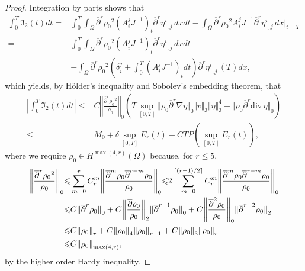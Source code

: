 \documentclass[12pt,twoside,reqno]{amsart}
\numberwithin{equation}{section}
\theoremstyle{definition}
\theoremstyle{remark}
\begin{document}
\begin{proof}
Integration by parts shows that
\begin{align*}
  \int_0^T {\mathfrak{I}}_2(t)dt=&{\int_0^T\!\!\!\!\int_\Omega }  {\overline{\partial}}^r{\rho_0}^2   (A^j_i J^{-1})_t{{{{\overline{\partial}}^r \eta^i}}_{,{j}}\,}dx dt-\int_\Omega {\overline{\partial}}^r{\rho_0}^2   A^j_i J^{-1}{{{{\overline{\partial}}^r \eta^i}}_{,{j}}\,}dx\Big|_{t=T}\\
  =&{\int_0^T\!\!\!\!\int_\Omega }  {\overline{\partial}}^r{\rho_0}^2   (A^j_i J^{-1})_t{{{{\overline{\partial}}^r \eta^i}}_{,{j}}\,}dx dt\\
  &-\int_\Omega {\overline{\partial}}^r{\rho_0}^2 \left( \delta_i^j+\int_0^T (A^j_i J^{-1})_tdt\right){{{{\overline{\partial}}^r \eta^i}}_{,{j}}\,}(T) dx,
\end{align*}
which yields, by H\"older's inequality and Sobolev's embedding theorem, that
\begin{align*}
  {\left\vert{\int_0^T {\mathfrak{I}}_2(t)dt}\right\vert}{\leqslant} &C{\left\Vert{\frac{{\overline{\partial}}^r{\rho_0}^2 }{\rho_0}}\right\Vert}_{0}\left(T\sup_{[0,T]} {\Vert{{\rho_0} {\overline{\partial}}^r{\nabla}\eta}\Vert}_0 {\Vert{v}\Vert}_3{\Vert{\eta}\Vert}_3^4+{\Vert{{\rho_0} {\overline{\partial}}^r{\mathrm{div}\,}\eta}\Vert}_0\right)\\
  {\leqslant} &M_0+\delta\sup_{[0,T]}E_r(t)+CTP(\sup_{[0,T]}E_r(t)),
\end{align*}
where we require ${\rho_0} \in H^{\max(4,r)}(\Omega)$ because, for $r{\leqslant} 5$,
\begin{align}
  {\left\Vert{\frac{{\overline{\partial}}^r{\rho_0}^2 }{\rho_0}}\right\Vert}_{0}{\leqslant}&\sum_{m=0}^rC_r^m{\left\Vert{\frac{{\overline{\partial}}^m {\rho_0}{\overline{\partial}}^{r-m}{\rho_0}}{\rho_0}}\right\Vert}_0{\leqslant} 2\sum_{m=0}^{{\left\lceil{(r-1)/2}\right\rceil}} C_r^m{\left\Vert{\frac{{\overline{\partial}}^m {\rho_0}{\overline{\partial}}^{r-m}{\rho_0}}{\rho_0}}\right\Vert}_0{\nonumber}\\
  {\leqslant}&C{\Vert{{\overline{\partial}}^r{\rho_0}}\Vert}_0+C{\left\Vert{\frac{{\overline{\partial}}{\rho_0}}{\rho_0}}\right\Vert}_2{\Vert{{\overline{\partial}}^{r-1}{\rho_0}}\Vert}_0 +C{\left\Vert{\frac{{\overline{\partial}}^2{\rho_0}}{\rho_0}}\right\Vert}_0{\Vert{{\overline{\partial}}^{r-2}{\rho_0}}\Vert}_2{\nonumber}\\
  {\leqslant}&C{\Vert{\rho_0}\Vert}_r+C{\Vert{\rho_0}\Vert}_4{\Vert{\rho_0}\Vert}_{r-1}+C{\Vert{\rho_0}\Vert}_3{\Vert{\rho_0}\Vert}_r{\nonumber}\\
  {\leqslant} &C{\Vert{\rho_0}\Vert}_{\max(4,r)},
\end{align}
 by the higher order Hardy inequality.


\end{proof}
\end{document}
